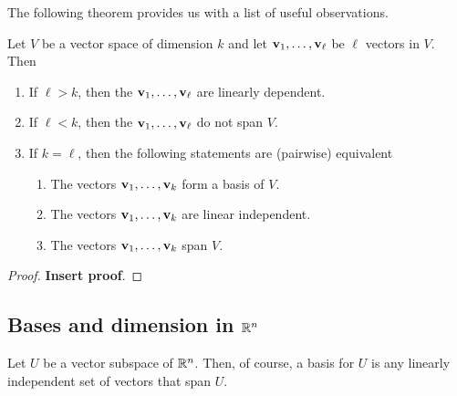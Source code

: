 \documentclass[10pt, a4paper]{article}
\begin{document}
The following theorem provides us with a list of useful observations.
\begin{theorem}
    Let $V$ be a vector space of dimension $k$ and let $\mathbf{v}_1, \dotsc, \mathbf{v}_{\ell}$ be $\ell$ vectors in $V$.
    Then
    \begin{enumerate}[label = (\roman*)]
        \item If $\ell > k$,
        then the $\mathbf{v}_1, \dotsc, \mathbf{v}_{\ell}$ are linearly dependent.
        \item If $\ell < k$,
        then the $\mathbf{v}_1, \dotsc, \mathbf{v}_{\ell}$ do not span $V$.
        \item If $k = \ell$,
        then the following statements are (pairwise) equivalent
        \begin{enumerate}[label = (\alph*)]
            \item The vectors $\mathbf{v}_1, \dotsc, \mathbf{v}_k$ form a basis of $V$.
            \item The vectors $\mathbf{v}_1, \dotsc, \mathbf{v}_k$ are linear independent.
            \item The vectors $\mathbf{v}_1, \dotsc, \mathbf{v}_k$ span $V$.
        \end{enumerate}
    \end{enumerate}
    \begin{proof}
        \textbf{Insert proof}.
    \end{proof}
\end{theorem}

\subsection{Bases and dimension in $\mathbb{R} ^ n$}
\begin{remark}
    Let $U$ be a vector subspace of $\mathbb{R} ^ n$.
    Then,
    of course,
    a basis for $U$ is any linearly independent set of vectors that span $U$.
\end{remark}
\end{document}
